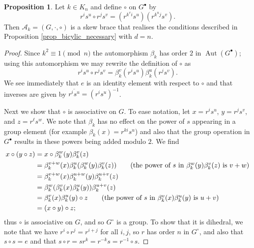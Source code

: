 \documentclass[reqno]{amsart}
\theoremstyle{definition}
\newtheorem{proposition}[theorem]{Proposition}
\renewcommand{\bar}{\overline}
\DeclareMathOperator{\Aut}{\mbox{Aut}}
\begin{document}
\begin{proposition} \label{prop_d_n_realise}
Let $ k \in K_{n} $ and define $ \circ $ on $ G^{\bullet} $ by
\[ r^{i}s^{u} \circ r^{j}s^{v} = \left( r^{k^{v}i}s^{u} \right)\left( r^{k^{u}j}s^{v} \right). \]
Then $ \mathscr{A}_{k} = (G,\cdot,\circ) $ is a skew brace that realises the conditions described in Proposition \ref{prop_bicylic_necessary} with $ d=n $. 
\end{proposition}
\begin{proof}
Since $ k^{2} \equiv 1 \pmod{n} $ the automorphism $ \beta_{k} $ has order $ 2 $ in $ \Aut(G^{\bullet}) $; using this automorphism we may rewrite the definition of $ \circ $ as
\[ r^{i}s^{u} \circ r^{j}s^{v} = \beta_{k}^{v}(r^{i}s^{u})\beta_{k}^{u}(r^{j}s^{v}). \]
We see immediately that $ e $ is an identity element with respect to $ \circ $ and that inverses are given by $ \bar{r^{i}s^{u}} = (r^{i}s^{u})^{-1} $. 

Next we show that $ \circ $ is associative on $ G $. To ease notation, let $ x=r^{i}s^{u} $, $ y=r^{j}s^{v} $, and $ z=r^{\ell}s^{w} $. We note that $ \beta_{k} $ has no effect on the power of $ s $ appearing in a group element (for example $ \beta_{k}(x) = r^{ki}s^{u} $) and also that the group operation in $ G^{\bullet} $ results in these powers being added modulo $ 2 $. We find 
\begin{align*}
x \circ (y \circ z) &= x \circ \beta_{k}^{w}(y)\beta_{k}^{v}(z) \\
&= \beta_{k}^{v+w}(x)\beta_{k}^{u}(\beta_{k}^{w}(y)\beta_{k}^{v}(z)) \tag{the power of $ s $ in $ \beta_{k}^{w}(y)\beta_{k}^{v}(z) $ is $ v+w $} \\
&= \beta_{k}^{v+w}(x)\beta_{k}^{u+w}(y)\beta_{k}^{u+v}(z) \\
&= \beta_{k}^{w}(\beta_{k}^{v}(x)\beta_{k}^{u}(y))\beta_{k}^{u+v}(z) \\
&= \beta_{k}^{v}(x)\beta_{k}^{u}(y) \circ z \tag{the power of $ s $ in $ \beta_{k}^{v}(x)\beta_{k}^{u}(y) $ is $ u+v $}\\
&=(x \circ y) \circ z;
\end{align*} 
thus $ \circ $ is associative on $ G $, and so $ G^{\circ} $ is a group. To show that it is dihedral, we note that we have $ r^{i} \circ r^{j} = r^{i+j} $ for all $ i,j $, so $ r $ has order $ n $ in $ G^{\circ} $, and also that $ s \circ s = e $ and that $ s \circ r = sr^{k} = r^{-k}s = r^{-1} \circ s $. 


\end{proof}
\end{document}
